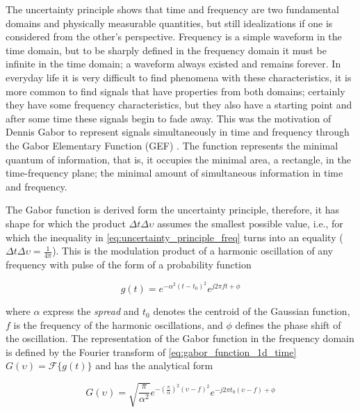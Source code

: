 The uncertainty principle shows that time and frequency are two fundamental domains and physically measurable quantities, but still idealizations if one is considered from the other's perspective.
Frequency is a simple waveform in the time domain, but to be sharply defined in the frequency domain it must be infinite in the time domain; a waveform always existed and remains forever. In everyday life it is very difficult to find phenomena with these characteristics, it is more common to find signals that have properties from both domains; certainly they have some frequency characteristics, but they also have a starting point and after some time these signals begin to fade away. This was the motivation of Dennis Gabor to represent signals simultaneously in time and frequency through the Gabor Elementary Function (GEF) \cite{Gabor:JIEE:1946a}. The function represents the minimal quantum of information, that is, it occupies the minimal area, a rectangle, in the time-frequency plane; the minimal amount of simultaneous information in time and frequency.  

The Gabor function is derived form the uncertainty principle, therefore, it has shape for which the product $\Delta t \Delta \upsilon$ assumes the smallest possible value, i.e., for which the inequality in \eqref{eq:uncertainty_principle_freq} turns into an equality ($\Delta t \Delta \upsilon = \frac{1}{4 \pi}$). This is the modulation product of a harmonic oscillation of any frequency with pulse of the form of a probability function \cite{Gabor:JIEE:1946a}

\begin{equation}\label{eq:gabor_function_1d_time}
    g(t) =  e ^{-\alpha^2(t-t_0)^2} e ^{j 2 \pi f t + \phi}
\end{equation}

where $\alpha$ express the \textit{spread} and $t_0$ denotes the centroid of the Gaussian function, $f$ is the frequency of the harmonic oscillations, and $\phi$ defines the phase shift of the oscillation. The representation of the Gabor function in the frequency domain is defined by the Fourier transform of \eqref{eq:gabor_function_1d_time} $G(\upsilon) = \mathcal{F}\{g(t)\}$ and has the analytical form

\begin{equation}\label{eq:gabor_function_1d_freq}
    G(\upsilon) =  \sqrt{\frac{\pi}{\alpha^2}} e ^{-\left(\frac{\pi}{\alpha}\right) ^{2} (\upsilon-f)^2} e ^{-j 2 \pi t_0 (\upsilon-f) + \phi}
\end{equation}

